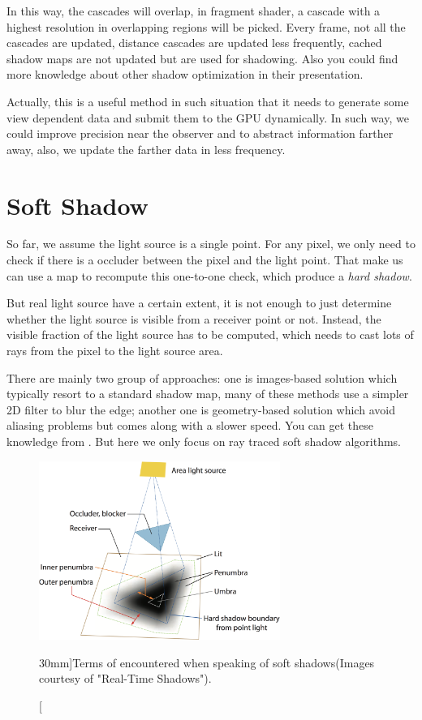 In this way, the cascades will overlap, in fragment shader, a cascade with a highest resolution in overlapping regions will be picked. Every frame, not all the cascades are updated, distance cascades are updated less frequently, cached shadow maps are not updated but are used for shadowing. Also you could find more knowledge about other shadow optimization in their presentation. 

Actually, this is a useful method in such situation that it needs to generate some view dependent data and submit them to the GPU dynamically. In such way, we could improve precision near the observer and to abstract information farther away, also, we update the farther data in less frequency. 


\section{Soft Shadow}
So far, we assume the light source is a single point. For any pixel, we only need to check if there is a occluder between the pixel and the light point. That make us can use a map to recompute this one-to-one check, which produce a \textit{hard shadow}. 

But real light source have a certain extent, it is not enough to just determine whether the light source is visible from a receiver point or not. Instead, the visible fraction of the light source has to be computed, which needs to cast lots of rays from the pixel to the light source area. 

There are mainly two group of approaches: one is images-based solution which typically resort to a standard shadow map, many of these methods use a simpler 2D filter to blur the edge; another one is geometry-based solution which avoid aliasing problems but comes along with a slower speed. You can get these knowledge from \cite{b:rts}. But here we only focus on ray traced soft shadow algorithms.

\begin{figure}\label{f:terms-of-soft-shadows}
\begin{center}
	\includegraphics[width=0.7\textwidth]{graphics/shadows/soft-shadow-terms}
\end{center}
\caption[][30mm]{Terms of encountered when speaking of soft shadows(Images courtesy of "Real-Time Shadows").}
\end{figure}

